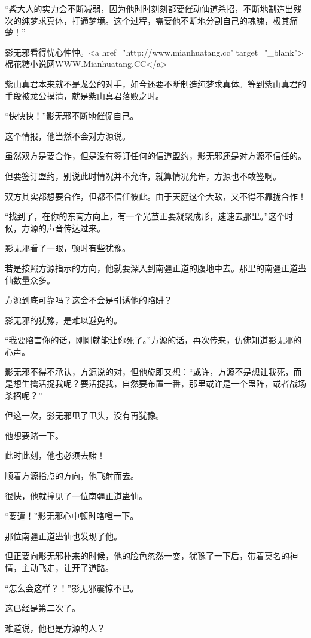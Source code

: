 \begin{this_body}
“紫大人的实力会不断减弱，因为他时时刻刻都要催动仙道杀招，不断地制造出残次的纯梦求真体，打通梦境。这个过程，需要他不断地分割自己的魂魄，极其痛楚！”

影无邪看得忧心忡忡。<a href="http://www.mianhuatang.cc" target="\_blank">棉花糖小说网WWW.Mianhuatang.CC</a>

紫山真君本来就不是龙公的对手，如今还要不断制造纯梦求真体。等到紫山真君的手段被龙公摸清，就是紫山真君落败之时。

“快快快！”影无邪不断地催促自己。

这个情报，他当然不会对方源说。

虽然双方是要合作，但是没有签订任何的信道盟约，影无邪还是对方源不信任的。

但要签订盟约，别说此时情况并不允许，就算情况允许，方源也不敢签啊。

双方其实都想要合作，但都不信任彼此。由于天庭这个大敌，又不得不靠拢合作！

“找到了，在你的东南方向上，有一个光茧正要凝聚成形，速速去那里。”这个时候，方源的声音传达过来。

影无邪看了一眼，顿时有些犹豫。

若是按照方源指示的方向，他就要深入到南疆正道的腹地中去。那里的南疆正道蛊仙数量众多。

方源到底可靠吗？这会不会是引诱他的陷阱？

影无邪的犹豫，是难以避免的。

“我要陷害你的话，刚刚就能让你死了。”方源的话，再次传来，仿佛知道影无邪的心声。

影无邪不得不承认，方源说的对，但他旋即又想：“或许，方源不是想让我死，而是想生擒活捉我呢？要活捉我，自然要布置一番，那里或许是一个蛊阵，或者战场杀招呢？”

但这一次，影无邪甩了甩头，没有再犹豫。

他想要赌一下。

此时此刻，他也必须去赌！

顺着方源指点的方向，他飞射而去。

很快，他就撞见了一位南疆正道蛊仙。

“要遭！”影无邪心中顿时咯噔一下。

那位南疆正道蛊仙也发现了他。

但正要向影无邪扑来的时候，他的脸色忽然一变，犹豫了一下后，带着莫名的神情，主动飞走，让开了道路。

“怎么会这样？！”影无邪震惊不已。

这已经是第二次了。

难道说，他也是方源的人？


\end{this_body}
